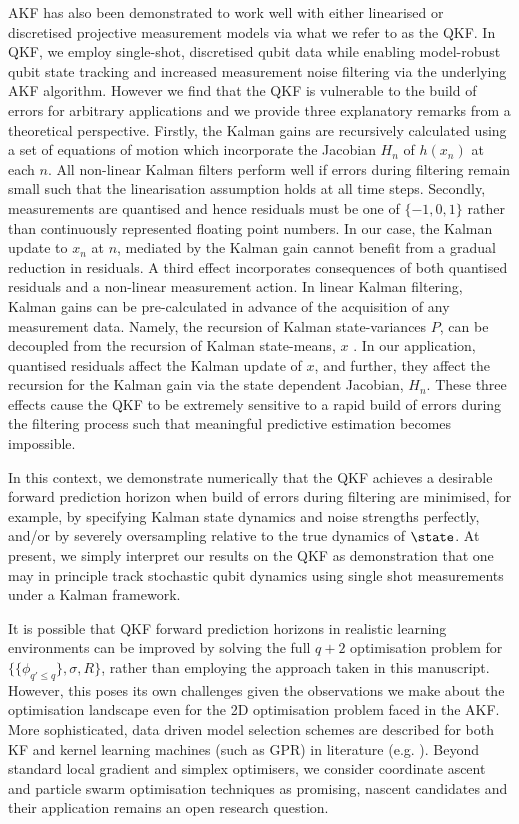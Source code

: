 AKF has also been demonstrated to work well with either linearised or discretised projective measurement models via what we refer to as the QKF.  In QKF, we employ single-shot, discretised qubit data while enabling model-robust qubit state tracking and increased measurement noise filtering via the underlying AKF algorithm.  However we find that the QKF is vulnerable to the build of errors for arbitrary applications and we provide three explanatory remarks from a theoretical perspective. Firstly, the Kalman gains are recursively calculated using a set of  equations of motion which incorporate the Jacobian $H_n$ of $h(x_n)$ at each $n$. All non-linear Kalman filters perform well if errors during filtering remain small such that the linearisation assumption holds at all time steps. Secondly, measurements are quantised and hence residuals must be one of $\{-1, 0, 1 \}$ rather than continuously represented floating point numbers.  In our case, the Kalman update to $x_n$ at $n$, mediated by the Kalman gain cannot benefit from a gradual reduction in residuals.  A third effect incorporates consequences of both quantised residuals and a non-linear measurement action. In linear Kalman filtering, Kalman gains can be pre-calculated in advance of the acquisition of any measurement data. Namely, the recursion of Kalman state-variances $P$, can be decoupled from the recursion of Kalman state-means, $x$ \cite{grewal2001theory}.  In our application, quantised residuals affect the Kalman update of $x$, and further, they affect the recursion for the Kalman gain via the state dependent Jacobian, $H_n$. These three effects cause the QKF to be extremely sensitive to a rapid build of errors during the filtering process such that meaningful predictive estimation becomes impossible.

In this context, we demonstrate numerically that the QKF achieves a desirable forward prediction horizon when build of errors during filtering are minimised, for example, by specifying Kalman state dynamics and noise strengths perfectly, and/or by severely oversampling relative to the true dynamics of $\state$.   At present, we simply interpret our results on the QKF as demonstration that one may in principle track stochastic qubit dynamics using single shot measurements under a Kalman framework.

 It is possible that QKF forward prediction horizons in realistic learning environments can be improved by solving the full $q+2$ optimisation problem for $\{\{ \phi_{q' \leq q}\}, \sigma, R\}$, rather than employing the approach taken in this manuscript. However, this poses its own challenges given the observations we make about the optimisation landscape even for the 2D optimisation problem faced in the AKF.  More sophisticated, data driven model selection schemes are described for both KF and kernel learning machines (such as GPR) in literature (e.g. \cite{arlot2009data, vu2015understanding}). Beyond standard local gradient and simplex optimisers, we consider coordinate ascent \cite{abbeel2005} and particle swarm optimisation techniques \cite{robertson2017particle} as promising, nascent candidates and their application remains an open research question. 

